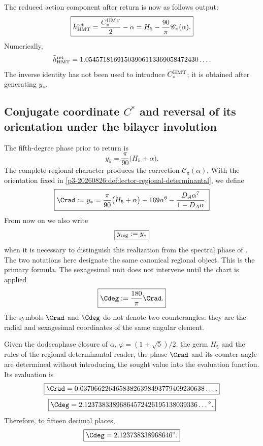 The reduced action component after return is now as follows
output:
\[
\boxed{
\bar h_{\rm HMT}^{\rm ret}
=\frac{C_*^{\rm HMT}}2-\alpha
=H_5-\frac{90}{\pi}\mathscr C_\pi(\alpha).}
\]
Numerically,
\[
\bar h_{\rm HMT}^{\rm ret}
=1.05457181691503906113369058472430\ldots.
\]
The inverse identity has not been used to introduce \(C_*^{\rm HMT}\); it is
obtained after generating \(y_*\).

\subsection{Conjugate coordinate \texorpdfstring{\(C^*\)}{C*} and reversal of its orientation under the bilayer involution}
\label{sec:s102:c38:4:2}


The fifth-degree phase prior to return is
\[
y_5=\frac\pi{90}\bigl(H_5+\alpha\bigr).
\]
The complete regional character produces the correction
\(\mathscr C_\pi(\alpha)\). With the orientation fixed in
\cref{p3-20260826:def:lector-regional-determinantal}, we define
\[
\boxed{
\Crad:=y_*=\frac\pi{90}\bigl(H_5+\alpha\bigr)
-169\alpha^6
-\frac{D_A\alpha^7}{1-D_A\alpha}.}
\]
From now on we also write
\[
 \boxed{y_{\rm reg}:=y_*}
\]
when it is necessary to distinguish this realization from the spectral phase of
\Gtr. The two notations here designate the same canonical regional object.
This is the primary formula. The sexagesimal unit does not intervene until the chart is applied
\[
\boxed{\Cdeg:=\frac{180}{\pi}\Crad.}
\]
The symbols \(\Crad\) and \(\Cdeg\) do not denote two counterangles: they are the
radial and sexagesimal coordinates of the same angular element.

\begin{theorem}
\label{p3-20260826:thm:contraangulo-regional}
Given the dodecaphase closure of \(\alpha\),
\(\varphi=(1+\sqrt5)/2\), the germ \(H_5\) and the rules of the regional
determinantal reader, the phase \(\Crad\) and its counter-angle are determined without
introducing the sought value into the evaluation function. Its evaluation is
\[
\boxed{
\Crad=0.03706622646583826398493779409230638\ldots,}
\]
\[
\boxed{
\Cdeg
=2.12373833896864572426195138039336\ldots{}^\circ.}
\]
Therefore, to fifteen decimal places,
\[
\boxed{\Cdeg=2.123738338968646^\circ.}
\]
\end{theorem}

